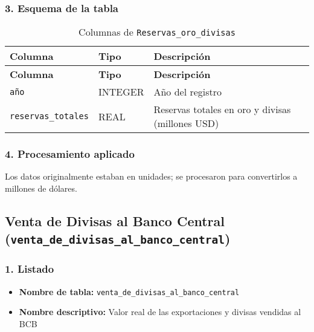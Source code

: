 \documentclass[12pt,a4paper]{article}
\begin{document}
\subsubsection*{3. Esquema de la tabla}
\begin{longtable}{@{}lll@{}}
\caption{Columnas de \texttt{Reservas\_oro\_divisas}}\\
\toprule
\textbf{Columna}       & \textbf{Tipo} & \textbf{Descripción} \\
\midrule
\endfirsthead
\toprule
\textbf{Columna}       & \textbf{Tipo} & \textbf{Descripción} \\
\midrule
\endhead
\bottomrule
\endfoot
\texttt{año}             & INTEGER & Año del registro \\
\texttt{reservas\_totales} & REAL    & Reservas totales en oro y divisas (millones USD) \\
\end{longtable}

\subsubsection*{4. Procesamiento aplicado}
Los datos originalmente estaban en unidades; se procesaron para convertirlos a millones de dólares.

\subsection{Venta de Divisas al Banco Central\\
\small(\texttt{venta\_de\_divisas\_al\_banco\_central})}

\subsubsection*{1. Listado}
\begin{itemize}
  \item \textbf{Nombre de tabla:} \texttt{venta\_de\_divisas\_al\_banco\_central}
  \item \textbf{Nombre descriptivo:} Valor real de las exportaciones y divisas vendidas al BCB
\end{itemize}
\end{document}
